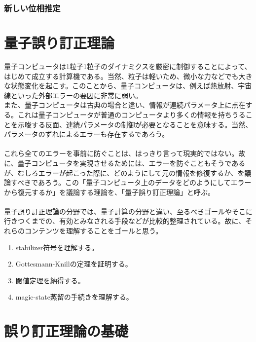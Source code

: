 \documentclass[a4paper,10.5pt]{article}
\numberwithin{equation}{section}
\begin{document}
\subsubsection{新しい位相推定}

\section{量子誤り訂正理論}
量子コンピュータは1粒子1粒子のダイナミクスを厳密に制御することによって、はじめて成立する計算機である。当然、粒子は軽いため、微小な力などでも大きな状態変化を起こす。このことから、量子コンピュータは、例えば熱放射、宇宙線といった外部エラーの要因に非常に弱い。\\
また、量子コンピュータは古典の場合と違い、情報が連続パラメータ上に点在する。これは量子コンピュータが普通のコンピュータより多くの情報を持ちうることを示唆する反面、連続パラメータの制御が必要となることを意味する。当然、パラメータのずれによるエラーも存在するであろう。\\
\\
これら全てのエラーを事前に防ぐことは、はっきり言って現実的ではない。故に、量子コンピュータを実現させるためには、エラーを防ぐこともそうであるが、むしろエラーが起こった際に、どのようにして元の情報を修復するか、を議論すべきであろう。この「量子コンピュータ上のデータをどのようにしてエラーから復元するか」を議論する理論を、「量子誤り訂正理論」と呼ぶ。\\
\\
量子誤り訂正理論の分野では、量子計算の分野と違い、至るべきゴールやそこに行きつくまでの、有効とみなされる手段などが比較的整理されている。故に、それらのコンテンツを理解することをゴールと思う。
\begin{goalbox}
\begin{enumerate}
    \item stabilizer符号を理解する。
    \item Gottesmann-Knillの定理を証明する。
    \item 閾値定理を納得する。
    \item magic-state蒸留の手続きを理解する。
\end{enumerate}
\end{goalbox}

\section{誤り訂正理論の基礎}
\end{document}
